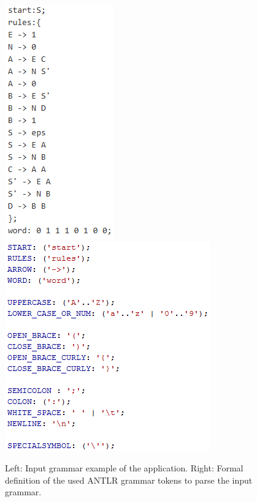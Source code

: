 \begin{figure} [h]
	\centering
	\includegraphics{abb/exampleGrammarInput.png}
	\includegraphics{abb/antrlTokens.png}
	\caption{Left: Input grammar example of the application. Right: Formal definition of the used ANTLR grammar tokens to parse the input grammar.}
	\label{antlrGrammarTokens}
\end{figure}
